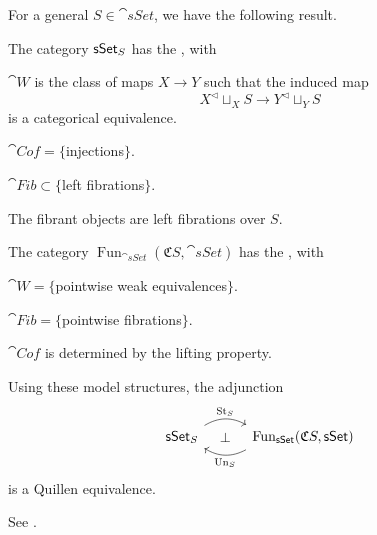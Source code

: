 For a general $S\in\cat{sSet}$, we have the following result.

\begin{theorem}\label{thm-5-g}
    The category $\textup{\textsf{sSet}}_{\/S}$ has the , with
    \begin{itms}
        \item $\cat{W}$ is the class of maps $X\to Y$ such that the induced map 
        \[ X^\vartriangleleft\mathop{\sqcup}_XS\to Y^\vartriangleleft\mathop{\sqcup}_YS \]
        is a categorical equivalence.
        \item $\cat{Cof}=\{$injections$\}$.
        \item $\cat{Fib}\subset\{$left fibrations$\}$.
        \item The fibrant objects are left fibrations over $S$.
    \end{itms}
    The category $\operatorname{Fun}_{\cat{sSet}}(\mathfrak CS,\cat{sSet})$
    has the , with
    \begin{itms}
        \item $\cat W=\{$pointwise weak equivalences$\}$.
        \item $\cat{Fib}=\{$pointwise fibrations$\}$.
        \item $\cat{Cof}$ is determined by the lifting property.
    \end{itms}
    Using these model structures, the adjunction
    \[\begin{tikzcd}[column sep=3em]
        \cat{sSet}_{\/S}\ar[r,bend left,start anchor=north east,end anchor=north west,"\operatorname{St}_S"]
        \ar[r,phantom,"\bot"] &
        \operatorname{Fun}_{\cat{sSet}}(\mathfrak CS,\cat{sSet})
        \ar[l,bend left,start anchor=south west,end anchor=south east,"\operatorname{Un}_S"]
    \end{tikzcd}\]
    is a Quillen equivalence.
\end{theorem}

See \cite[Theorem~2.2.1.2]{htt}.

